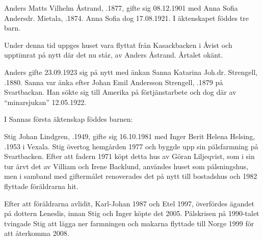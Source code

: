 Anders Matts Vilhelm Åstrand, .1877, gifte sig 08.12.1901 med Anna Sofia Andersdr. Mietala, .1874. Anna Sofia dog 17.08.1921. I äktenskapet föddes tre barn.
\begin{jhchildren}
  \item {}
  \item {}
  \item {}
\end{jhchildren}
Under denna tid uppges huset vara flyttat från Kasackbacken i Åvist och upptimrat på nytt där det nu står, av Anders Åstrand. Årtalet okänt.

Anders gifte 23.09.1923 sig på nytt med änkan Sanna Katarina Joh.dr. Strengell, .1880. Sanna var änka efter Johan Emil Andersson Strengell, .1879 på Svartbackan. Han sökte sig till Amerika på förtjänstarbete och dog där av ``minarsjukan'' 12.05.1922.

I Sannas första äktenskap föddes barnen:
\begin{jhchildren}
  \item {}
  \item {}
  \item {}
\end{jhchildren}




Stig Johan Lindgren, .1949, gifte sig 16.10.1981 med Inger Berit Helena Helsing, .1953 i Vexala. Stig övertog hemgården 1977 och byggde upp sin pälsfarmning på Svartbacken. Efter att fadern 1971 köpt detta hus av Göran Liljeqvist, som i sin tur ärvt det av Villiam och Irene Backlund, användes huset som pälsningshus, men i samband med giftermålet renoverades det på nytt till bostadshus och 1982 flyttade föräldrarna hit.

Efter att föräldrarna avlidit, Karl-Johan 1987 och Etel 1997, överfördes ägandet på dottern Leneslis, innan Stig och Inger köpte det 2005. Pälskrisen på 1990-talet tvingade Stig att lägga ner farmningen och makarna flyttade till Norge 1999 för att återkomma 2008.


